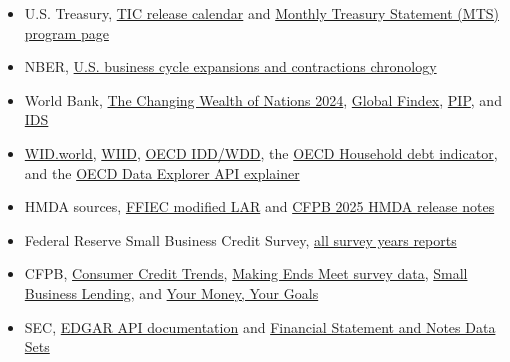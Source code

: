 \documentclass[11pt,openany]{book}
\begin{document}
\begin{itemize}
  \item U.S. Treasury, \href{https://home.treasury.gov/data/treasury-international-capital-tic-system/release-dates-of-tic-data}{TIC release calendar} and \href{https://www.fiscal.treasury.gov/reports-statements/mts/}{Monthly Treasury Statement (MTS) program page}
  \item NBER, \href{https://www.nber.org/research/data/us-business-cycle-expansions-and-contractions}{U.S. business cycle expansions and contractions chronology}
  \item World Bank, \href{https://www.worldbank.org/en/publication/the-changing-wealth-of-nations}{The Changing Wealth of Nations 2024}, \href{https://www.worldbank.org/en/publication/globalfindex/download-data}{Global Findex}, \href{https://datacatalog.worldbank.org/search/dataset/0038020/poverty-and-equity-database-poverty-and-inequality-platform}{PIP}, and \href{https://www.worldbank.org/en/programs/debt-statistics/ids}{IDS}
  \item \href{https://wid.world/}{WID.world}, \href{https://www.wider.unu.edu/database/world-income-inequality-database-wiid}{WIID}, \href{https://www.oecd.org/en/data/datasets/income-and-wealth-distribution-database.html}{OECD IDD/WDD}, the \href{https://www.oecd.org/en/data/indicators/household-debt.html}{OECD Household debt indicator}, and the \href{https://www.oecd.org/en/data/insights/data-explainers/2024/09/api.html}{OECD Data Explorer API explainer}
  \item HMDA sources, \href{https://ffiec.cfpb.gov/data-publication/modified-lar}{FFIEC modified LAR} and \href{https://www.consumerfinance.gov/about-us/newsroom/2025-hmda-data-on-mortgage-lending-now-available/}{CFPB 2025 HMDA release notes}
  \item Federal Reserve Small Business Credit Survey, \href{https://www.fedsmallbusiness.org/reports/survey/}{all survey years reports}
  \item CFPB, \href{https://www.consumerfinance.gov/data-research/consumer-credit-trends/}{Consumer Credit Trends}, \href{https://www.consumerfinance.gov/data-research/making-ends-meet-survey-data/}{Making Ends Meet survey data}, \href{https://www.consumerfinance.gov/data-research/small-business-lending/}{Small Business Lending}, and \href{https://www.consumerfinance.gov/your-money-your-goals/}{Your Money, Your Goals}
  \item SEC, \href{https://www.sec.gov/edgar/sec-api-documentation}{EDGAR API documentation} and \href{https://www.sec.gov/data-research/sec-markets-data}{Financial Statement and Notes Data Sets}

\end{itemize}
\end{document}
